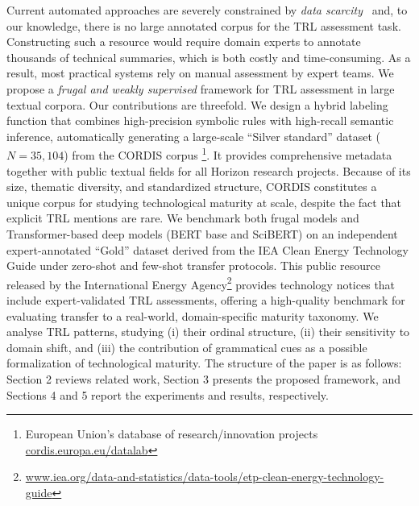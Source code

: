 \documentclass[runningheads]{llncs}
\begin{document}
Current automated approaches are severely constrained by \emph{data scarcity}~\cite{Voltan2024} and, to our knowledge, there is no large annotated corpus for the TRL assessment task. Constructing such a resource would require domain experts to annotate thousands of technical summaries, which is both costly and time-consuming. As a result, most practical systems rely on manual assessment by expert teams. 
We propose a \emph{frugal and weakly
supervised} framework for TRL assessment in large textual corpora. Our
contributions are threefold. 
We design a hybrid labeling function that combines high-precision symbolic rules with high-recall semantic inference, automatically generating a large-scale ``Silver standard'' dataset ($N = 35{,}104$) from the CORDIS corpus 
\footnote{European Union’s database of research/innovation projects \url{cordis.europa.eu/datalab}}.
It provides comprehensive metadata together with public textual fields for all Horizon 
research projects. 
Because of its size, thematic diversity, and standardized structure, CORDIS constitutes a unique corpus for studying technological maturity at scale, despite the fact that explicit TRL mentions are rare.
We benchmark both frugal models and Transformer-based deep models (BERT base and SciBERT) on an independent expert-annotated “Gold” dataset derived from the IEA Clean Energy Technology Guide under zero-shot and few-shot transfer protocols. This public resource released by the International Energy Agency\footnote{\url{www.iea.org/data-and-statistics/data-tools/etp-clean-energy-technology-guide}}
 provides technology notices that include expert-validated TRL assessments, offering a high-quality benchmark for evaluating transfer to a real-world, domain-specific maturity taxonomy.
We analyse TRL patterns, studying (i) their ordinal structure, (ii) their sensitivity to domain shift, and (iii) the contribution of grammatical cues as a possible formalization of technological maturity.
The structure of the paper is as follows: Section 2 reviews related work, Section 3 presents the proposed framework, and Sections 4 and 5 report the experiments and results, respectively.
\end{document}
